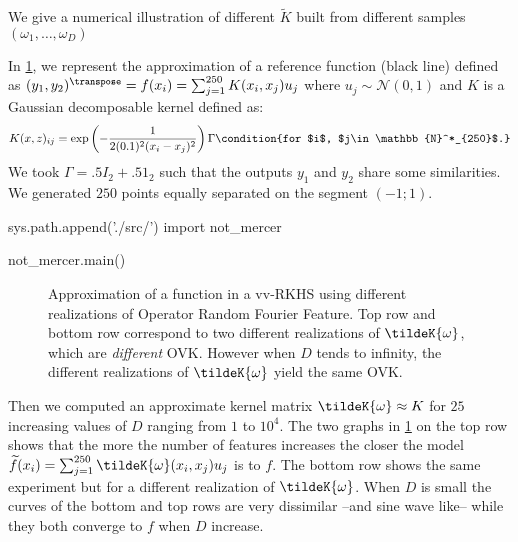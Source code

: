 We give a numerical illustration of different $\tilde{K}$ built from different samples $(\omega_1, \ldots, \omega_D)$

In \cref{fig:not_Mercer}, we represent the approximation of  a reference function (black line) defined as $(y_1, y_2)^\transpose
= f(x_i)=\sum_{j=1}^{250}K(x_i,x_j)u_j$ where $u_j\sim\mathcal{N}(0,1)$ and $K$ is a Gaussian decomposable kernel defined as:
\begin{dmath*}
    K(x,z)_{ij}=\exp\left(-\frac{1}{2(0.1)^2(x_i - x_j)^2}\right)\Gamma
    \condition{for $i$, $j\in\mathbb{N}^*_{250}$.}
\end{dmath*}
We took $\Gamma=.5 I_2 +.5 1_2$ such that the outputs $y_1$ and
$y_2$ share some similarities.
We
generated $250$ points equally separated on the segment $(-1;1)$.
\begin{pycode}
sys.path.append('./src/')
import not_mercer

not_mercer.main()
\end{pycode}
\begin{figure}[htb]
    \caption[Approximation of a function in a vv-RKHS using different realizations of Operator Random Fourier Feature]{Approximation of a function in a vv-RKHS using different realizations of Operator Random Fourier Feature.
    Top row and bottom row correspond to two different realizations of
    $\tildeK{\omega}$, which are \emph{different} \acl{OVK}. However when $D$
    tends to infinity, the different realizations of $\tildeK{\omega}$ yield
    the same \acs{OVK}.}
    \label{fig:not_Mercer}
\end{figure}

 Then we computed an approximate kernel matrix
$\tildeK{\omega}\approx K$ for $25$ increasing values of $D$ ranging from $1$
to $10^4$. The two graphs in \cref{fig:not_Mercer} on the top row shows that the more the number of
features increases the closer the model
$\widetilde{f}(x_i)=\sum_{j=1}^{250}\tildeK{\omega}(x_i,x_j)u_j$ is to $f$. The
bottom row shows the same experiment but for a different realization of
$\tildeK{\omega}$. When $D$ is small the curves of the bottom and top rows are
very dissimilar --and sine wave like-- while they both converge to $f$ when $D$
increase.
